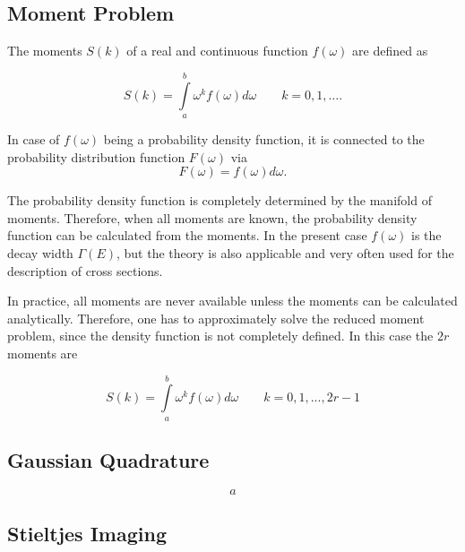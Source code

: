 \subsection{Moment Problem}

The moments $S(k)$ of a real and continuous function $f(\omega)$ are defined
as

\begin{equation}
  S(k) = \int\limits_a^b \omega^k f(\omega) d\omega \quad\quad k=0,1,\dots  .
\end{equation}

In case of $f(\omega)$ being a probability density function, it is connected
to the probability distribution function $F(\omega)$ via
\begin{equation}
  F(\omega) = f(\omega){d\omega} .
\end{equation}

The probability density function is completely determined by the manifold
of moments. Therefore, when all moments are known, the probability density
function can be calculated from the moments. In the present case $f(\omega)$
is the decay width $\Gamma(E)$, but the theory is also applicable and very often
used for the description of cross sections.

In practice, all moments are never available unless the moments can be
calculated analytically. Therefore, one has to approximately solve the reduced
moment problem, since the density function is not completely defined.
In this case the $2r$ moments are

\begin{equation}
  S(k) = \int\limits_a^b \omega^k f(\omega) d\omega \quad\quad k=0,1,...,2r-1
\end{equation}





\subsection{Gaussian Quadrature}

\begin{figure}[h]
  \centering
  
  \caption{}
  \label{}
\end{figure}

\begin{equation}
a
\end{equation}



\subsection{Stieltjes Imaging}

